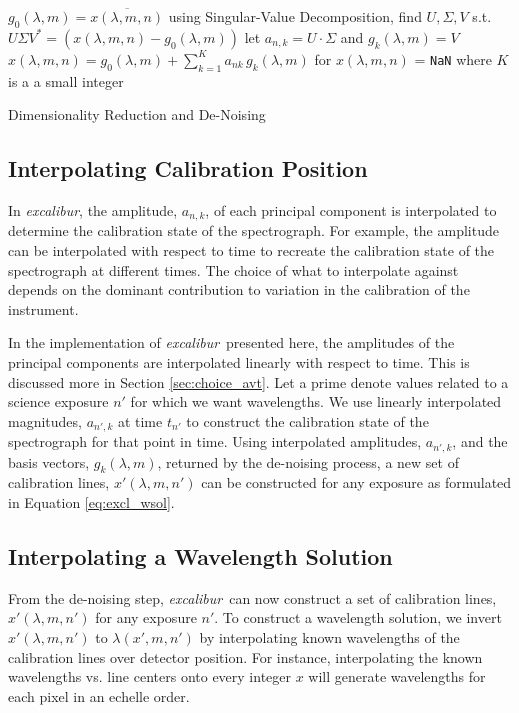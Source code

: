 \documentclass[twocolumn,table,xcolor,trackchanges]{aastex63}
\newcommand{\project}[1]{\textsl{#1}}
\newcommand{\name}{\project{excalibur}}
\newcommand{\code}[1]{\texttt{#1}}
\begin{document}
\begin{algorithm}
\SetAlgoLined
{}
{
	$g_0(\lambda,m) = \overline{x(\lambda,m,n)}$\;
	using Singular-Value Decomposition, find $U, \Sigma, V$ s.t. $U\Sigma V^* = (x(\lambda,m,n)-g_0(\lambda,m))$\;
	let $a_{n,k} = U\cdot \Sigma$ and $g_k(\lambda,m) = V$\;
	$x(\lambda,m,n) = g_0(\lambda,m) + \sum_{k=1}^K a_{nk}\,g_k(\lambda,m)$ for $x(\lambda,m,n)$ = \code{NaN} where $K$ is a a small integer
	}
\caption{Dimensionality Reduction and De-Noising}
\end{algorithm}

\subsection{Interpolating Calibration Position}
 \label{sec:interp_time}
In \name, the amplitude, $a_{n,k}$, of each principal component is interpolated to determine the calibration state of the spectrograph.  For example, the amplitude can be interpolated with respect to time to recreate the calibration state of the spectrograph at different times.  The choice of what to interpolate against depends on the dominant contribution to variation in the calibration of the instrument.

In the implementation of \name\ presented here, the amplitudes of the principal components are interpolated linearly with respect to time.  This is discussed more in Section \ref{sec:choice_avt}.  Let a prime denote values related to a science exposure $n'$ for which we want wavelengths.  We use linearly interpolated magnitudes, $a_{n',k}$ at time $t_{n'}$ to construct the calibration state of the spectrograph for that point in time.  Using interpolated amplitudes, $a_{n',k}$, and the basis vectors, $g_k(\lambda,m)$, returned by the de-noising process, a new set of calibration lines, $x'(\lambda,m,n')$ can be constructed for any exposure as formulated in Equation \ref{eq:excl_wsol}.


\subsection{Interpolating a Wavelength Solution} \label{sec:interp_wsol}
From the de-noising step, \name\ can now construct a set of calibration lines, $x'(\lambda,m,n')$ for any exposure $n'$.  To construct a wavelength solution, we invert $x'(\lambda,m,n')$ to $\lambda(x',m,n')$ by interpolating known wavelengths of the calibration lines over detector position.  For instance, interpolating the known wavelengths vs. line centers onto every integer $x$ will generate wavelengths for each pixel in an echelle order.
\end{document}

